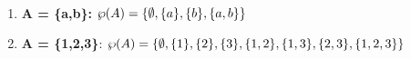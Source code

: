 \documentclass{abntex2}
\begin{document}
\begin{enumerate}
\begin{itemize}
\begin{math}
      \end{math}
    \end{itemize}
    \begin{enumerate}
      \item \textbf{A = \{a,b\}:}
      \begin{math}
        \\ \wp(A) = \{\emptyset, \{a\},\{b\},\{a,b\}\}
      \end{math}
      \item \textbf{A = \{1,2,3\}}:
      \begin{math}
        \\ \wp(A)= \{\emptyset, \{1\}, \{2\}, \{3\}, \{1,2\}, \{1,3\}, \{2,3\} ,\{1,2,3\}\}
      \end{math}
    \end{enumerate}
  \end{enumerate}
\end{document}
